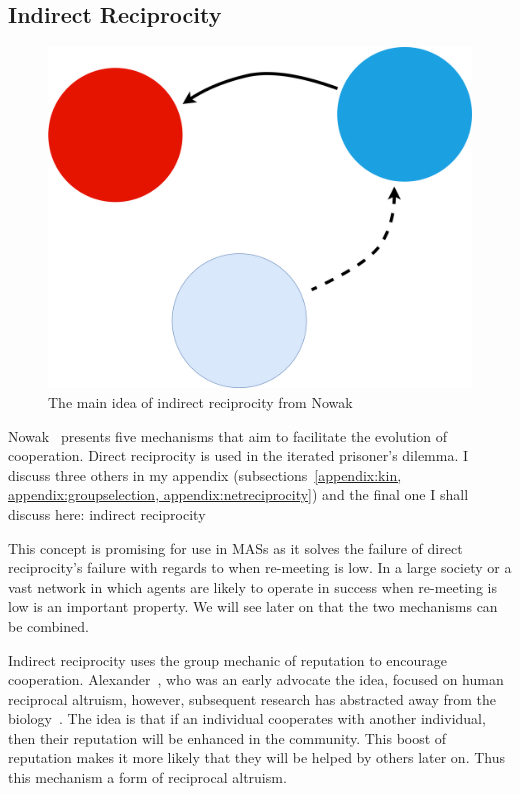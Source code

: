 \documentclass[]{final_report}
\begin{document}
\subsection{Indirect Reciprocity}
\begin{figure}
\vspace{-20pt}
\begin{framed}
	\center
	\includegraphics[width=\textwidth]{IndirectRec.png}
	\caption{The main idea of indirect reciprocity from Nowak~\cite{five_rules_coop}}
	\label{fig:indir_rec}
\end{framed}
\vspace{-20pt}
\end{figure}
Nowak~\cite{five_rules_coop} presents five mechanisms that aim to facilitate the evolution of cooperation. Direct reciprocity is used in the iterated prisoner's dilemma. I discuss three others in my appendix (subsections~\ref{appendix:kin, appendix:groupselection, appendix:netreciprocity}) and the final one I shall discuss here: indirect reciprocity\par
This concept is promising for use in MASs as it solves the failure of direct reciprocity's failure with regards to when re-meeting is low. In a large society or a vast network in which agents are likely to operate in success when re-meeting is low is an important property. We will see later on that the two mechanisms can be combined.\par
Indirect reciprocity uses the group mechanic of reputation to encourage cooperation. Alexander~\cite{alexander1987biology}, who was an early advocate the idea, focused on human reciprocal altruism, however, subsequent research has abstracted away from the biology~\cite{phelps_game_theoretic_analysis, imagevsstanding, evol_indirect_image, evoldirindir, five_rules_coop, leimarhammer, sugden2004economics, gossip_alt, mui2002computational}. The idea is that if an individual cooperates with another individual, then their reputation will be enhanced in the community. This boost of reputation makes it more likely that they will be helped by others later on. Thus this mechanism a form of reciprocal altruism.\par
\end{document}
